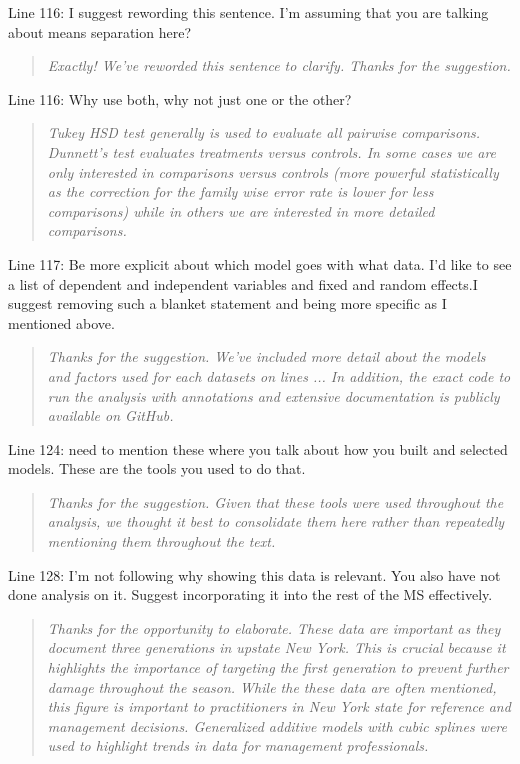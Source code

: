 \documentclass{article}
\begin{document}
Line 116:  I suggest rewording this sentence. I'm assuming that you are talking about means separation here?

\begin{quote}
    \textit{Exactly!  We've reworded this sentence to clarify.  Thanks for the suggestion.  }
\end{quote}

Line 116: Why use both, why not just one or the other? 

\begin{quote}
    \textit{Tukey HSD test generally is used to evaluate all pairwise comparisons.  Dunnett's test evaluates treatments versus controls.  In some cases we are only interested in comparisons versus controls (more powerful statistically as the correction for the family wise error rate is lower for less comparisons) while in others we are interested in more detailed comparisons.  }
\end{quote}

Line 117: Be more explicit about which model goes with what data. I'd like to see a list of dependent and independent variables and fixed and random effects.I suggest removing such a blanket statement and being more specific as I mentioned above.

\begin{quote}
    \textit{Thanks for the suggestion.  We've included more detail about the models and factors used for each datasets on lines ...  In addition, the exact code to run the analysis with annotations and extensive documentation is publicly available on GitHub.  }
\end{quote}

Line 124: need to mention these where you talk about how you built and selected models. These are the tools you used to do that.

\begin{quote}
    \textit{Thanks for the suggestion.  Given that these tools were used throughout the analysis, we thought it best to consolidate them here rather than repeatedly mentioning them throughout the text.  }
\end{quote}

Line 128: I'm not following why showing this data is relevant. You also have not done analysis on it. Suggest incorporating it into the rest of the MS effectively.

\begin{quote}
    \textit{Thanks for the opportunity to elaborate.  These data are important as they document three generations in upstate New York.  This is crucial because it highlights the importance of targeting the first generation to prevent further damage throughout the season.  While the these data are often mentioned, this figure is important to practitioners in New York state for reference and management decisions.  Generalized additive models with cubic splines were used to highlight trends in data for management professionals.  }
\end{quote}
\end{document}
